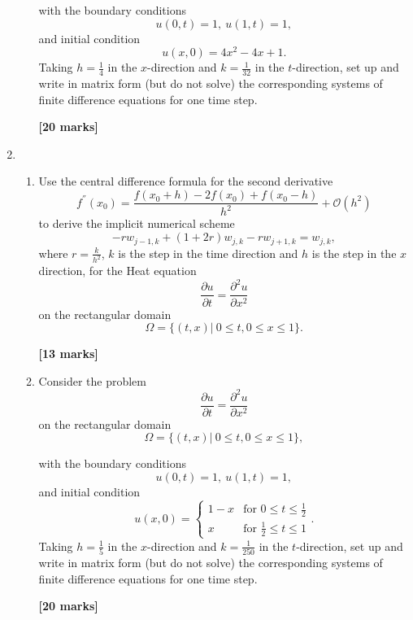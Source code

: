 \begin{enumerate}
\begin{enumerate}
	with the boundary conditions
	\[ u(0,t)=1, \ u(1,t)=1,   \]
	and initial condition
	\[	u(x,0)=4x^2-4x+1.\]
		Taking $h=\frac{1}{4}$ in the $x$-direction and $k=\frac{1}{32}$ in the $t$-direction, set up and write in matrix form (but do not solve) the corresponding systems of finite difference equations for one time step.\\
\begin{flushright}
\textbf{[20 marks]}
\end{flushright}
\end{enumerate}

	\item 
\begin{enumerate}
	
	\item 
	Use the central difference formula for the second derivative 
	\[ f^{''}(x_0)=\frac{f(x_0+h)-2f(x_0)+f(x_0-h)}{h^2}+\mathcal{O}(h^2)\]
	to derive the implicit numerical scheme
	\[-rw_{j-1,k}+(1+2r)w_{j,k}-rw_{j+1,k}=w_{j,k},\]
	where $r=\frac{k}{h^2}$, $k$ is the step in the time direction and $h$ is the step in the $x$ direction, 
	for the Heat equation 
	\[\frac{\partial u}{\partial t}=\frac{\partial^2 u}{\partial x^2} \]
	on the rectangular domain
		\[\Omega=\{(t,x)| \ 0\leq t, 0 \leq x \leq 1\}. \]

\begin{flushright}
\textbf{[13 marks]}
\end{flushright}
	
	\item Consider the problem
	\[\frac{\partial u}{\partial t}=\frac{\partial^2 u}{\partial x^2} \]
	on the rectangular domain
		\[\Omega=\{(t,x)| \ 0\leq t, 0 \leq x \leq 1\},\]

	with the boundary conditions
	\[ u(0,t)=1, \ u(1,t)=1,   \]
	and initial condition
	\[	u(x,0)=\begin{cases}
	1-x & \text{for }0\leq t \leq \frac{1}{2}\\
	x & \text{for } \frac{1}{2}\leq t \leq 1
	\end{cases}. \]
		Taking $h=\frac{1}{5}$ in the $x$-direction and $k=\frac{1}{250}$ in the $t$-direction, set up and write in matrix form (but do not solve) the corresponding systems of finite difference equations for one time step.\\
\begin{flushright}
\textbf{[20 marks]}

\end{flushright}
	
	
\end{enumerate}


\end{enumerate}
